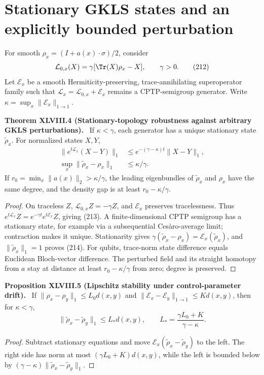 \documentclass[11pt,a4paper,oneside]{book}
\newcommand{\statement}[3]{\par\medskip\noindent\textbf{#1 #2 (#3).}\ }
\begin{document}
\section{Stationary GKLS states and an explicitly bounded perturbation}
For smooth $\rho_x=(I+a(x)\cdot\sigma)/2$, consider
\begin{equation}\mathcal L_{0,x}(X)=\gamma[\Tr(X)\rho_x-X],\qquad\gamma>0.\tag{212}\end{equation}
Let $\mathcal E_x$ be a smooth Hermiticity-preserving, trace-annihilating superoperator family such that $\mathcal L_x=\mathcal L_{0,x}+\mathcal E_x$ remains a CPTP-semigroup generator. Write $\kappa=\sup_x\|\mathcal E_x\|_{1\to1}$.
\statement{Theorem}{XLVIII.4}{Stationary-topology robustness against arbitrary GKLS perturbations}
If $\kappa<\gamma$, each generator has a unique stationary state $\widetilde\rho_x$. For normalized states $X,Y$,
\begin{align}\|e^{t\mathcal L_x}(X-Y)\|_1&\le e^{-(\gamma-\kappa)t}\|X-Y\|_1,\tag{213}\\
\sup_x\|\widetilde\rho_x-\rho_x\|_1&\le\kappa/\gamma.\tag{214}\end{align}
If $r_0=\min_x\|a(x)\|_2>\kappa/\gamma$, the leading eigenbundles of $\widetilde\rho_x$ and $\rho_x$ have the same degree, and the density gap is at least $r_0-\kappa/\gamma$.
\begin{proof}
On traceless $Z$, $\mathcal L_{0,x}Z=-\gamma Z$, and $\mathcal E_x$ preserves tracelessness. Thus $e^{t\mathcal L_x}Z=e^{-\gamma t}e^{t\mathcal E_x}Z$, giving (213). A finite-dimensional CPTP semigroup has a stationary state, for example via a subsequential Ces\`aro-average limit; contraction makes it unique. Stationarity gives $\gamma(\widetilde\rho_x-\rho_x)=\mathcal E_x(\widetilde\rho_x)$, and $\|\widetilde\rho_x\|_1=1$ proves (214). For qubits, trace-norm state difference equals Euclidean Bloch-vector difference. The perturbed field and its straight homotopy from $a$ stay at distance at least $r_0-\kappa/\gamma$ from zero; degree is preserved.
\end{proof}
\statement{Proposition}{XLVIII.5}{Lipschitz stability under control-parameter drift}
If $\|\rho_x-\rho_y\|_1\le L_0d(x,y)$ and $\|\mathcal E_x-\mathcal E_y\|_{1\to1}\le Kd(x,y)$, then for $\kappa<\gamma$,
\begin{equation}\|\widetilde\rho_x-\widetilde\rho_y\|_1\le L_*d(x,y),\qquad L_*=\frac{\gamma L_0+K}{\gamma-\kappa}.\tag{215}\end{equation}
\begin{proof}
Subtract stationary equations and move $\mathcal E_x(\widetilde\rho_x-\widetilde\rho_y)$ to the left. The right side has norm at most $(\gamma L_0+K)d(x,y)$, while the left is bounded below by $(\gamma-\kappa)\|\widetilde\rho_x-\widetilde\rho_y\|_1$.
\end{proof}
\end{document}
